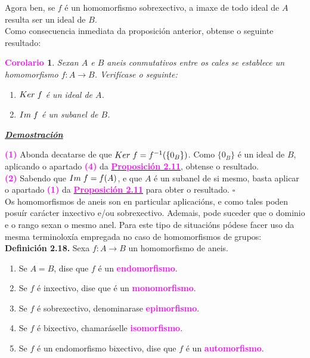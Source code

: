 \documentclass[twoside]{report}
\newcommand{\magbf}[1]{\textcolor{magenta}{\textbf{#1}}} %
\theoremstyle{mystyle}
\newtheorem{cor}{\magbf{Corolario}}[chapter]
\newenvironment{corollary}
{\begin{mdframed}[linecolor = magenta,backgroundcolor = classicrose, linewidth = 2mm]\begin{cor}}
{\end{cor}\end{mdframed}}
\begin{document}
\noindent Agora ben, se $f$ é un homomorfismo sobrexectivo, a imaxe de todo ideal de $A$ resulta ser un ideal de $B$.\\

\noindent Como consecuencia inmediata da proposición anterior, obtense o seguinte resultado:\\

\begin{corollary} \label{cor2.3}
Sexan $A$ e $B$ aneis conmutativos entre os cales se establece un homomorfismo $f: A \longrightarrow B$. Verifícase o seguinte:
\begin{enumerate}
    \item $Ker \hspace{1mm} f$ é un ideal de $A$.
    \item $Im \hspace{1mm} f$ é un subanel de $B$.
\end{enumerate}
\end{corollary}

\vspace{2mm}

\noindent \textbf{\textit{\underline{Demostración}}}

\vspace{2mm}

\noindent \magbf{(1)} Abonda decatarse de que $Ker \hspace{1mm} f = f^{-1}(\{0_{B}\})$. Como $\{0_{B}\}$ é un ideal de $B$, aplicando o apartado \magbf{(4)} da \hyperref[prop2.11]{\magbf{Proposición 2.11}}, obtense o resultado.\\

\noindent \magbf{(2)} Sabendo que $Im \hspace{1mm} f = f(A)$, e que $A$ é un subanel de si mesmo, basta aplicar o apartado \magbf{(1)} da \hyperref[prop2.11]{\magbf{Proposición 2.11}} para obter o resultado. $\square$\\

\noindent Os homomorfismos de aneis son en particular aplicacións, e como tales poden posuír carácter inxectivo e/ou sobrexectivo. Ademais, pode suceder que o dominio e o rango sexan o mesmo anel. Para este tipo de situacións pódese facer uso da mesma terminoloxía empregada no caso de homomorfismos de grupos:\\

\noindent \textbf{Definición 2.18.} Sexa $f: A \longrightarrow B$ un homomorfismo de aneis.
\begin{enumerate}
    \item Se $A = B$, dise que $f$ é un \magbf{endomorfismo}.
    \item Se $f$ é inxectivo, dise que é un \magbf{monomorfismo}.
    \item Se $f$ é sobrexectivo, denominarase \magbf{epimorfismo}.
    \item Se $f$ é bixectivo, chamaráselle \magbf{isomorfismo}.
    \item Se $f$ é un endomorfismo bixectivo, dise que $f$ é un \magbf{automorfismo}.
\end{enumerate}
\end{document}
